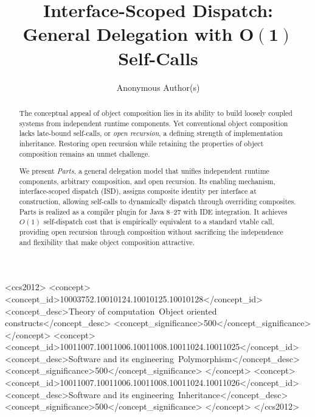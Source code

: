 \documentclass[acmsmall,screen,review,anonymous]{acmart}
\theoremstyle{acmplain}
\begin{document}
\title{Interface-Scoped Dispatch:\texorpdfstring{\\}{ }General Delegation with \texorpdfstring{$\boldsymbol{O(1)}$}{O(1)} Self-Calls}

\author{Anonymous Author(s)}
\renewcommand{\shortauthors}{Anonymous Author(s)}

\begin{abstract}
The conceptual appeal of object composition lies in its ability to build loosely coupled systems from independent runtime
components. Yet conventional object composition lacks late-bound self-calls, or \emph{open recursion}, a defining strength
of implementation inheritance. Restoring open recursion while retaining the properties of object composition remains an
unmet challenge.

We present \emph{Parts}, a general delegation model that unifies independent runtime components, arbitrary composition,
and open recursion. Its enabling mechanism, interface-scoped dispatch (ISD), assigns composite identity per interface at
construction, allowing self-calls to dynamically dispatch through overriding composites. Parts is realized as a compiler
plugin for Java 8--27 with IDE integration. It achieves $O(1)$ self-dispatch cost that is empirically equivalent to a standard
vtable call, providing open recursion through composition without sacrificing the independence and flexibility that make
object composition attractive.
\end{abstract}


\begin{CCSXML}
<ccs2012>
   <concept>
       <concept_id>10003752.10010124.10010125.10010128</concept_id>
       <concept_desc>Theory of computation~Object oriented constructs</concept_desc>
       <concept_significance>500</concept_significance>
       </concept>
   <concept>
       <concept_id>10011007.10011006.10011008.10011024.10011025</concept_id>
       <concept_desc>Software and its engineering~Polymorphism</concept_desc>
       <concept_significance>500</concept_significance>
       </concept>
   <concept>
       <concept_id>10011007.10011006.10011008.10011024.10011026</concept_id>
       <concept_desc>Software and its engineering~Inheritance</concept_desc>
       <concept_significance>500</concept_significance>
       </concept>
 </ccs2012>
\end{CCSXML}
\end{document}
